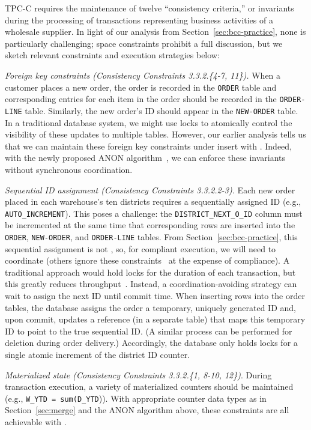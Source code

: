 TPC-C requires the maintenance of twelve ``consistency criteria,'' or
invariants during the processing of transactions representing business
activities of a wholesale supplier. In light of our analysis from
Section~\ref{sec:bcc-practice}, none is particularly challenging;
space constraints prohibit a full discussion, but we sketch relevant
constraints and execution strategies below:
\begin{myitemize}

\item \textit{Foreign key constraints (Consistency Constraints
  3.3.2.\{4-7, 11\}).} When a customer places a new order, the order
  is recorded in the \texttt{ORDER} table and corresponding entries
  for each item in the order should be recorded in the
  \texttt{ORDER-LINE} table. Similarly, the new order's ID should
  appear in the \texttt{NEW-ORDER} table. In a traditional database
  system, we might use locks to atomically control the visibility of
  these updates to multiple tables. However, our earlier analysis
  tells us that we can maintain these foreign key constraints under
  insert with \cfreedom. Indeed, with the newly proposed ANON
  algorithm~\cite{ramp-txns}, we can enforce these invariants without
  synchronous coordination.

\item \textit{Sequential ID assignment (Consistency Constraints
  3.3.2.2-3).} Each new order placed in each warehouse's ten districts
  requires a sequentially assigned ID (e.g.,
  \texttt{AUTO\_INCREMENT}). This poses a challenge: the
  \texttt{DISTRICT\_NEXT\_O\_ID} column must be incremented at the
  same time that corresponding rows are inserted into the
  \texttt{ORDER}, \texttt{NEW-ORDER}, and \texttt{ORDER-LINE}
  tables. From Section~\ref{sec:bcc-practice}, this sequential
  assignment is not \cfree, so, for compliant execution, we will need
  to coordinate (others ignore these constraints~\cite{hat-vldb,silo}
  at the expense of compliance). A traditional approach would hold
  locks for the duration of each transaction, but this greatly reduces
  throughput~\cite{abadi-vll}. Instead, a coordination-avoiding
  strategy can wait to assign the next ID until commit time. When
  inserting rows into the order tables, the database assigns the order
  a temporary, uniquely generated ID and, upon commit, updates a
  reference (in a separate table) that maps this temporary ID to point
  to the true sequential ID. (A similar process can be performed for
  deletion during order delivery.) Accordingly, the database only
  holds locks for a single atomic increment of the district ID
  counter.

\item \textit{Materialized state (Consistency Constraints 3.3.2.\{1,
  8-10, 12\})}. During transaction execution, a variety of
  materialized counters should be maintained (e.g., \texttt{W\_YTD =
    sum(D\_YTD})). With appropriate counter data types as in
  Section~\ref{sec:merge} and the ANON algorithm above, these
  constraints are all achievable with \cfreedom.
\end{myitemize}

